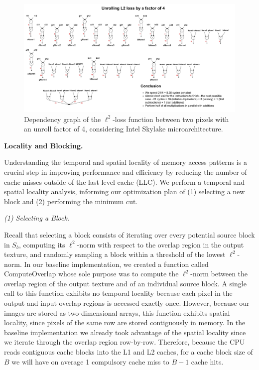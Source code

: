 \documentclass[letterpaper]{article}
\newcommand{\mypar}[1]{{\bf #1.}}
\newcommand{\inline}[1]{{\ttfamily\hyphenchar\font=45 #1}}
\begin{document}
\begin{figure}[htbp]
\centering
  \includegraphics[scale=0.18]{Unrolling.pdf}
  \caption{Dependency graph of the $\ell^2$-loss function between two pixels with an unroll factor of 4, considering Intel Skylake microarchitecture.\label{unroll}}
\end{figure}

\mypar{Locality and Blocking}

Understanding the temporal and spatial locality of memory access patterns is a crucial step in improving performance and efficiency by reducing the number of cache misses outside of the last level cache (LLC). We perform a temporal and spatial locality analysis, informing our optimization plan of (1) selecting a new block and (2) performing the minimum cut. 

\textit{(1) Selecting a Block.}

Recall that selecting a block consists of iterating over every potential source block in $S_b$, computing its $\ell ^2$-norm with respect to the overlap region in the output texture, and randomly sampling a block within a threshold of the lowest $\ell ^2$-norm. In our baseline implementation, we created a function called \inline{ComputeOverlap} whose sole purpose was to compute the $\ell ^2$-norm between the overlap region of the output texture and of an individual source block. A single call to this function exhibits no temporal locality because each pixel in the output and input overlap regions is accessed exactly once. However, because our images are stored as two-dimensional arrays, this function exhibits spatial locality, since pixels of the same row are stored contiguously in memory. In the baseline implementation we already took advantage of the spatial locality since we iterate through the overlap region row-by-row. Therefore, because the CPU reads contiguous cache blocks into the L1 and L2 caches, for a cache block size of $B$ we will have on average 1 compulsory cache miss to $B-1$ cache hits.
\end{document}
